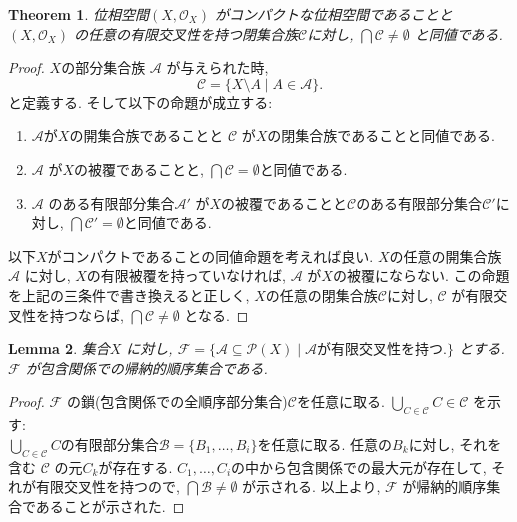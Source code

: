 \documentclass[lualatex]{ltjsbook}
\newtheorem{theorem}{Theorem}[chapter]
\newtheorem{lemma}[theorem]{Lemma}
\theoremstyle{remark}
\theoremstyle{plain}
\begin{document}
\begin{theorem}
	位相空間$\left( X ,  \mathcal{O}_{X} \right)$ がコンパクトな位相空間であることと$\left( X ,  \mathcal{O}_{X} \right)$ の任意の有限交叉性を持つ閉集合族$\mathcal{C}$に対し,  $\bigcap \mathcal{C} \neq \emptyset $ と同値である.
\end{theorem}

\begin{proof}
	$X$の部分集合族 $\mathcal{A}$ が与えられた時,  
	\[
	\mathcal{C} = \{X \setminus A  \mid  A \in \mathcal{A} \} 
	.\] 
	と定義する. そして以下の命題が成立する:
	\begin{enumerate}
		\item $\mathcal{A}$が$X$の開集合族であることと $\mathcal{C}$ が$X$の閉集合族であることと同値である.
		\item $\mathcal{A}$ が$X$の被覆であることと,   $\bigcap \mathcal{C} = \emptyset$と同値である.
		\item $\mathcal{A}$ のある有限部分集合$\mathcal{A}'$ が$X$の被覆であることと$\mathcal{C}$のある有限部分集合$\mathcal{C}'$に対し,  $\bigcap \mathcal{C}' = \emptyset$と同値である.
	\end{enumerate}
	以下$X$がコンパクトであることの同値命題を考えれば良い.  $X$の任意の開集合族$\mathcal{A}$ に対し,  $X$の有限被覆を持っていなければ,   $\mathcal{A}$ が$X$の被覆にならない.
	この命題を上記の三条件で書き換えると正しく,   $X$の任意の閉集合族$\mathcal{C}$に対し,   $\mathcal{C}$ が有限交叉性を持つならば,  $\bigcap \mathcal{C} \neq \emptyset$ となる.
\end{proof}

\begin{lemma}
	集合$X$ に対し,  $\mathcal{F }= \{ \mathcal{A} \subseteq \mathcal{P}(X)  \mid  \mathcal{A} \text{が有限交叉性を持つ.}\} $ とする. $\mathcal{F}$ が包含関係での帰納的順序集合である.
\end{lemma}

\begin{proof}
	$\mathcal{F}$ の鎖(包含関係での全順序部分集合)$ \mathcal{C}$を任意に取る. $\bigcup_{C \in \mathcal{C}} C \in \mathcal{C}$ を示す:\\
	$\bigcup_{C \in \mathcal{C}} C$の有限部分集合$\mathcal{B}=\{B_1,  \ldots ,  B_i\} $を任意に取る. 任意の$B_k$に対し,  それを含む $\mathcal{C}$ の元$C_k$が存在する.  $C_1,  \ldots , C_i $の中から包含関係での最大元が存在して,  それが有限交叉性を持つので,  $\bigcap \mathcal{B} \neq \emptyset$ が示される.
以上より,  $\mathcal{F}$ が帰納的順序集合であることが示された.
\end{proof}
\end{document}
